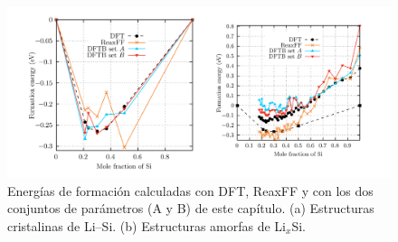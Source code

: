 \begin{figure}[h]
    \centering
    \includegraphics[width=\textwidth]{Silicio/modelo/resultados/formacion/energias.png}
    \caption{Energías de formación calculadas con DFT, ReaxFF y con los dos 
    conjuntos de parámetros (A y B) de este capítulo. (a) Estructuras cristalinas
    de Li--Si. (b) Estructuras amorfas de Li$_x$Si.}
    \label{fig:eform}
\end{figure}
